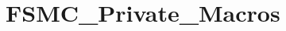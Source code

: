 \hypertarget{group___f_s_m_c___private___macros}{}\section{F\+S\+M\+C\+\_\+\+Private\+\_\+\+Macros}
\label{group___f_s_m_c___private___macros}

